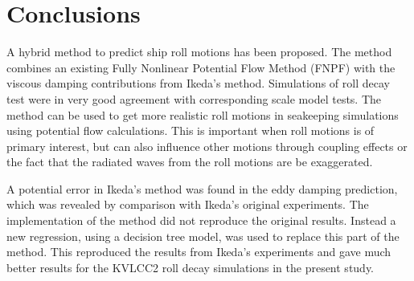 \section{Conclusions}\label{conclusions}

A hybrid method to predict ship roll motions has been proposed. The
method combines an existing Fully Nonlinear Potential Flow Method (FNPF)
with the viscous damping contributions from Ikeda's method. Simulations
of roll decay test were in very good agreement with corresponding scale
model tests. The method can be used to get more realistic roll motions
in seakeeping simulations using potential flow calculations. This is
important when roll motions is of primary interest, but can also
influence other motions through coupling effects or the fact that the
radiated waves from the roll motions are be exaggerated.

A potential error in Ikeda's method was found in the eddy damping
prediction, which was revealed by comparison with Ikeda's original
experiments. The implementation of the method did not reproduce the
original results. Instead a new regression, using a decision tree model,
was used to replace this part of the method. This reproduced the results
from Ikeda's experiments and gave much better results for the KVLCC2
roll decay simulations in the present study.

    